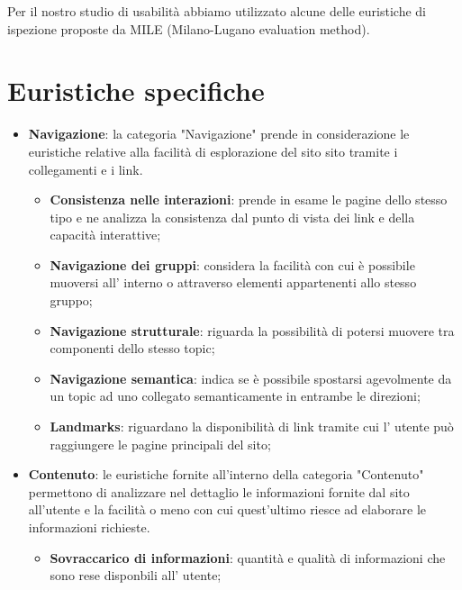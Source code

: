     Per il nostro studio di usabilità abbiamo utilizzato alcune delle euristiche
    di ispezione proposte da MILE (Milano-Lugano evaluation method).
    \section{Euristiche specifiche}
        \begin{itemize}
            \item \textbf{Navigazione}: la categoria "Navigazione" prende in
            considerazione le euristiche relative alla facilità di esplorazione del sito
            sito tramite i collegamenti e i link.
            \begin{itemize}
                \item \textbf{Consistenza nelle interazioni}: prende in esame le
                pagine dello stesso tipo e ne analizza la consistenza dal punto
                di vista dei link e della capacità interattive;
                \item \textbf{Navigazione dei gruppi}: considera la facilità con
                cui è possibile muoversi all' interno o attraverso elementi
                appartenenti allo stesso gruppo;
                \item \textbf{Navigazione strutturale}: riguarda la possibilità
                di potersi muovere tra componenti dello stesso topic;
                \item \textbf{Navigazione semantica}: indica se è possibile
                spostarsi agevolmente da un topic ad uno collegato
                semanticamente in entrambe le direzioni;
                \item \textbf{Landmarks}: riguardano la disponibilità di link
                tramite cui l' utente può raggiungere le pagine principali del
                sito;
            \end{itemize}
            \item \textbf{Contenuto}: le euristiche fornite all'interno della categoria
            "Contenuto" permettono di analizzare nel dettaglio le informazioni fornite
            dal sito all'utente e la facilità o meno con cui quest'ultimo riesce ad 
            elaborare le informazioni richieste.
            \begin{itemize}
                \item \textbf{Sovraccarico di informazioni}: quantità e qualità
                di informazioni che sono rese disponbili all' utente;

\end{itemize}
\end{itemize}
